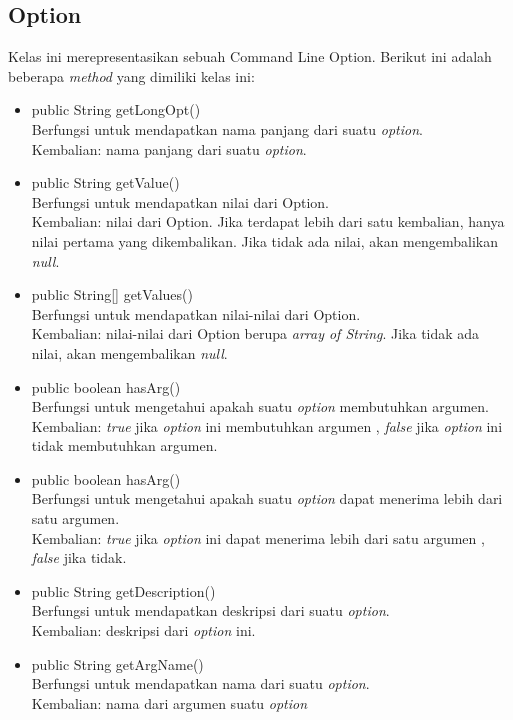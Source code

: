\subsection{Option}
\label{subsec:option}
Kelas ini merepresentasikan sebuah Command Line Option. Berikut ini adalah beberapa \textit{method} yang dimiliki kelas ini: 
\begin{itemize}
\item public String getLongOpt()\\
Berfungsi untuk mendapatkan nama panjang dari suatu \textit{option}.\\
Kembalian: nama panjang dari suatu \textit{option}.
\item public String getValue()\\
Berfungsi untuk mendapatkan nilai dari Option.\\
Kembalian: nilai dari Option. Jika terdapat lebih dari satu kembalian, hanya nilai pertama yang dikembalikan. Jika tidak ada nilai, akan mengembalikan \textit{null}.

\item public String[] getValues()\\
Berfungsi untuk mendapatkan nilai-nilai dari Option.\\
Kembalian: nilai-nilai dari Option berupa \textit{array of String}. Jika tidak ada nilai, akan mengembalikan \textit{null}.

\item public boolean hasArg()\\
Berfungsi untuk mengetahui apakah suatu \textit{option} membutuhkan argumen.\\
Kembalian: \textit{true} jika \textit{option} ini membutuhkan argumen , \textit{false} jika \textit{option} ini tidak membutuhkan argumen.

\item public boolean hasArg()\\
Berfungsi untuk mengetahui apakah suatu \textit{option} dapat menerima lebih dari satu argumen.\\
Kembalian: \textit{true} jika \textit{option} ini dapat menerima lebih dari satu argumen , \textit{false} jika tidak.

\item public String getDescription()\\
Berfungsi untuk mendapatkan deskripsi dari suatu \textit{option}.\\
Kembalian: deskripsi dari \textit{option} ini.
\item public String getArgName()\\
Berfungsi untuk mendapatkan nama dari suatu \textit{option}.\\
Kembalian: nama dari argumen suatu \textit{option}


\end{itemize}

